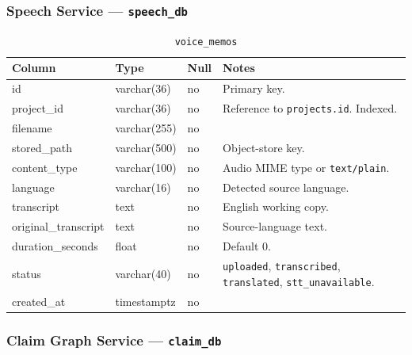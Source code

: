 \documentclass[11pt,a4paper]{article}
\begin{document}
\subsubsection{Speech Service --- \texttt{speech\_db}}

\begin{table}[ht]
\centering
\caption{\texttt{voice\_memos}}
\small
\begin{tabular}{@{}llll@{}}
\toprule
\textbf{Column} & \textbf{Type} & \textbf{Null} & \textbf{Notes} \\
\midrule
id & varchar(36) & no & Primary key. \\
project\_id & varchar(36) & no & Reference to \texttt{projects.id}. Indexed. \\
filename & varchar(255) & no & \\
stored\_path & varchar(500) & no & Object-store key. \\
content\_type & varchar(100) & no & Audio MIME type or \texttt{text/plain}. \\
language & varchar(16) & no & Detected source language. \\
transcript & text & no & English working copy. \\
original\_transcript & text & no & Source-language text. \\
duration\_seconds & float & no & Default 0. \\
status & varchar(40) & no & \texttt{uploaded}, \texttt{transcribed}, \texttt{translated}, \texttt{stt\_unavailable}. \\
created\_at & timestamptz & no & \\
\bottomrule
\end{tabular}
\end{table}

\subsubsection{Claim Graph Service --- \texttt{claim\_db}}
\end{document}
